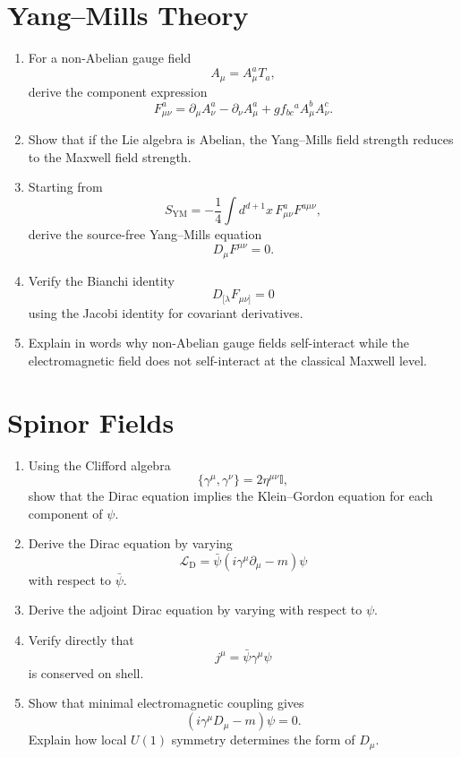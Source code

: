 \section{Yang--Mills Theory}

\begin{enumerate}
    \item For a non-Abelian gauge field
    \[
        A_\mu=A_\mu^aT_a,
    \]
    derive the component expression
    \[
        F_{\mu\nu}^a=\partial_\mu A_\nu^a-\partial_\nu A_\mu^a
        +g f_{bc}{}^aA_\mu^bA_\nu^c.
    \]

    \item Show that if the Lie algebra is Abelian, the Yang--Mills field strength
    reduces to the Maxwell field strength.

    \item Starting from
    \[
        S_{\mathrm{YM}}=-\frac{1}{4}\int d^{d+1}x\,F_{\mu\nu}^aF^{a\mu\nu},
    \]
    derive the source-free Yang--Mills equation
    \[
        D_\mu F^{\mu\nu}=0.
    \]

    \item Verify the Bianchi identity
    \[
        D_{[\lambda}F_{\mu\nu]}=0
    \]
    using the Jacobi identity for covariant derivatives.

    \item Explain in words why non-Abelian gauge fields self-interact while the
    electromagnetic field does not self-interact at the classical Maxwell level.
\end{enumerate}

\section{Spinor Fields}

\begin{enumerate}
    \item Using the Clifford algebra
    \[
        \{\gamma^\mu,\gamma^\nu\}=2\eta^{\mu\nu}\mathbb{I},
    \]
    show that the Dirac equation implies the Klein--Gordon equation for each
    component of \(\psi\).

    \item Derive the Dirac equation by varying
    \[
        \mathcal{L}_{\mathrm{D}}=\bar\psi(i\gamma^\mu\partial_\mu-m)\psi
    \]
    with respect to \(\bar\psi\).

    \item Derive the adjoint Dirac equation by varying with respect to \(\psi\).

    \item Verify directly that
    \[
        j^\mu=\bar\psi\gamma^\mu\psi
    \]
    is conserved on shell.

    \item Show that minimal electromagnetic coupling gives
    \[
        (i\gamma^\mu D_\mu-m)\psi=0.
    \]
    Explain how local \(U(1)\) symmetry determines the form of \(D_\mu\).
\end{enumerate}

